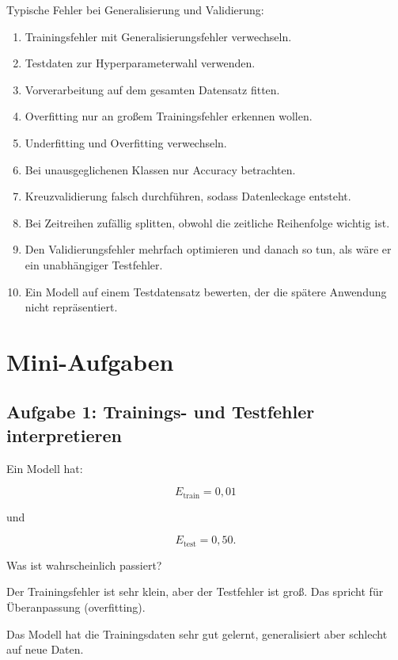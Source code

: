 \begin{examtipbox}
Typische Fehler bei Generalisierung und Validierung:

\begin{enumerate}
    \item Trainingsfehler mit Generalisierungsfehler verwechseln.
    \item Testdaten zur Hyperparameterwahl verwenden.
    \item Vorverarbeitung auf dem gesamten Datensatz fitten.
    \item Overfitting nur an großem Trainingsfehler erkennen wollen.
    \item Underfitting und Overfitting verwechseln.
    \item Bei unausgeglichenen Klassen nur Accuracy betrachten.
    \item Kreuzvalidierung falsch durchführen, sodass Datenleckage entsteht.
    \item Bei Zeitreihen zufällig splitten, obwohl die zeitliche Reihenfolge wichtig ist.
    \item Den Validierungsfehler mehrfach optimieren und danach so tun, als wäre er ein unabhängiger Testfehler.
    \item Ein Modell auf einem Testdatensatz bewerten, der die spätere Anwendung nicht repräsentiert.
\end{enumerate}
\end{examtipbox}

\section{Mini-Aufgaben}

\subsection{Aufgabe 1: Trainings- und Testfehler interpretieren}

Ein Modell hat:

\[
    E_{\mathrm{train}} = 0{,}01
\]

und

\[
    E_{\mathrm{test}} = 0{,}50.
\]

Was ist wahrscheinlich passiert?

\begin{examplebox}
Der Trainingsfehler ist sehr klein, aber der Testfehler ist groß.
Das spricht für Überanpassung (overfitting).

Das Modell hat die Trainingsdaten sehr gut gelernt, generalisiert aber schlecht auf neue Daten.
\end{examplebox}

